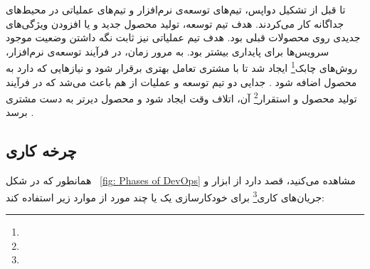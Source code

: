 تا قبل از تشکیل دواپس، تیم‌های توسعه‌ی نرم‌افزار و تیم‌های عملیاتی در محیط‌های جداگانه کار می‌کردند. هدف تیم توسعه، تولید محصول جدید و یا افزودن ویژگی‌های جدیدی روی محصولات قبلی بود. هدف تیم عملیاتی نیز ثابت نگه داشتن وضعیت موجود سرویس‌ها برای پایداری بیشتر بود. به مرور زمان، در فرآیند توسعه‌ی نرم‌افزار، روش‌های چابک\footnote{}
ایجاد شد تا با مشتری تعامل بهتری برقرار شود و نیازهایی که دارد به محصول اضافه شود \cite{DevopsAgile}. جدایی دو تیم توسعه و عملیات از هم باعث می‌شد که در فرآیند تولید محصول و استقرار\footnote{} آن، اتلاف وقت ایجاد شود و محصول دیرتر به دست مشتری برسد \cite{DevopsCD}.


\subsection{چرخه کاری}
همانطور که در شکل 
~\ref{fig: Phases of DevOps}
مشاهده می‌کنید،
قصد دارد از ابزار و جریان‌های کاری\footnote{} برای خودکارسازی یک یا چند مورد از موارد زیر استفاده کند: 
